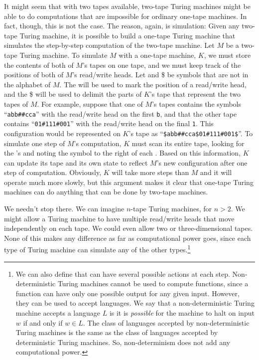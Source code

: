It might seem that with two tapes available, two-tape Turing machines
might be able to do computations that are impossible for ordinary
one-tape machines.  In fact, though, this is not the case.  The reason,
again, is simulation:  Given any two-tape Turing machine, it is possible
to build a one-tape Turing machine that simulates the step-by-step
computation of the two-tape machine.  Let $M$ be a two-tape Turing
machine.  To simulate $M$ with a one-tape machine, $K$, we must store
the contents of both of $M$'s tapes on one tape, and we must keep
track of the positions of both of $M$'s read/write heads.
Let {\at} and \$ be symbols that are not in the alphabet of $M$.  
The {\at} will be used to mark the position of a read/write head, and
the \$ will be used to delimit the parts of $K$'s tape that
represent the two tapes of $M$.  For example, suppose that one
of $M$'s tapes contains the symbols ``{\tt abb\#\#cca}'' with the
read/write head on the first {\tt b}, and that the other tape contains
``{\tt 01\#111\#001}'' with the read/write head on the final {\tt 1}.  This
configuration would be represented on $K$'s tape as
``{\tt\$a{\at}bb\#\#cca\$01\#111\#00{\at}1\$}''.  To simulate one
step of $M$'s computation, $K$ must scan its entire tape, looking for
the {\at}'s and noting the symbol to the right of each {\at}.  Based on
this information, $K$ can update its tape and its own state to
reflect $M$'s new configuration after one step of computation.
Obviously, $K$ will take more steps than $M$ and it will operate
much more slowly, but this argument makes it clear that one-tape
Turing machines can do anything that can be done by two-tape
machines.

We needn't stop there.  We can imagine $n$-tape Turing machines, for
$n>2$.  We might allow a Turing machine to have multiple read/write
heads that move independently on each tape.  We could even allow
two or three-dimensional tapes.  None of this makes any difference 
as far as computational power goes, since each type of Turing machine
can simulate any of the other types.\footnote{We can also define 
 that can have several possible
actions at each step.  Non-deterministic Turing machines cannot be
used to compute functions, since a function can have only one possible
output for any given input.  However, they can be used to accept
languages.  We say that a non-deterministic Turing machine accepts
a language $L$ is it is \emph{possible} for the machine to halt
on input $w$ if and only if $w\in L$.  The class of languages 
accepted by non-deterministic Turing machines is the same as the
class of languages accepted by deterministic Turing machines.
So, non-determinism does not add any computational power.}

